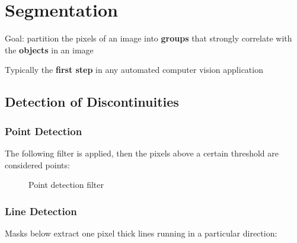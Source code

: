 \section*{Segmentation}

Goal: partition the pixels of an image into \textbf{groups} that
strongly correlate with the \textbf{objects} in an image

Typically the \textbf{first step} in any automated computer vision application

\subsection*{Detection of Discontinuities}

\subsubsection*{Point Detection}

The following filter is applied, then the pixels above a certain
threshold are considered points:

\vspace{-0.3cm}
\begin{figure}[H]
  \centering
  \caption{Point detection filter}
\end{figure}

\subsubsection*{Line Detection}

Masks below extract one pixel thick lines running in a particular direction:

